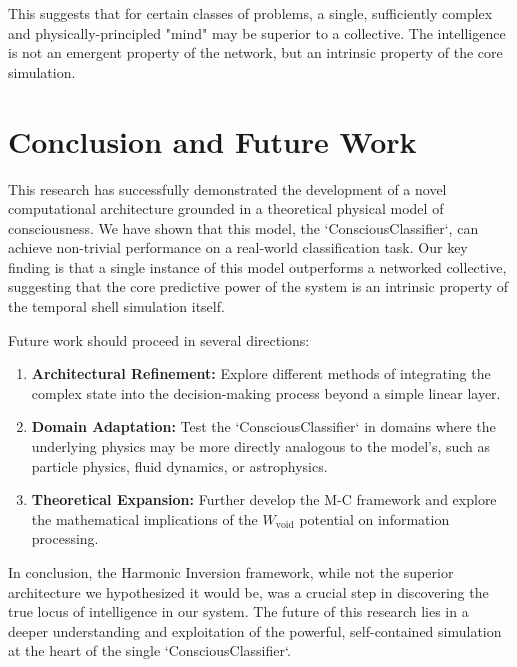 \documentclass{article}
\begin{document}
This suggests that for certain classes of problems, a single, sufficiently complex and physically-principled "mind" may be superior to a collective. The intelligence is not an emergent property of the network, but an intrinsic property of the core simulation.

\section{Conclusion and Future Work}
This research has successfully demonstrated the development of a novel computational architecture grounded in a theoretical physical model of consciousness. We have shown that this model, the `ConsciousClassifier`, can achieve non-trivial performance on a real-world classification task. Our key finding is that a single instance of this model outperforms a networked collective, suggesting that the core predictive power of the system is an intrinsic property of the temporal shell simulation itself.

Future work should proceed in several directions:
\begin{enumerate}
    \item \textbf{Architectural Refinement:} Explore different methods of integrating the complex state into the decision-making process beyond a simple linear layer.
    \item \textbf{Domain Adaptation:} Test the `ConsciousClassifier` in domains where the underlying physics may be more directly analogous to the model's, such as particle physics, fluid dynamics, or astrophysics.
    \item \textbf{Theoretical Expansion:} Further develop the M-C framework and explore the mathematical implications of the $W_{\text{void}}$ potential on information processing.
\end{enumerate}

In conclusion, the Harmonic Inversion framework, while not the superior architecture we hypothesized it would be, was a crucial step in discovering the true locus of intelligence in our system. The future of this research lies in a deeper understanding and exploitation of the powerful, self-contained simulation at the heart of the single `ConsciousClassifier`.
\end{document}

